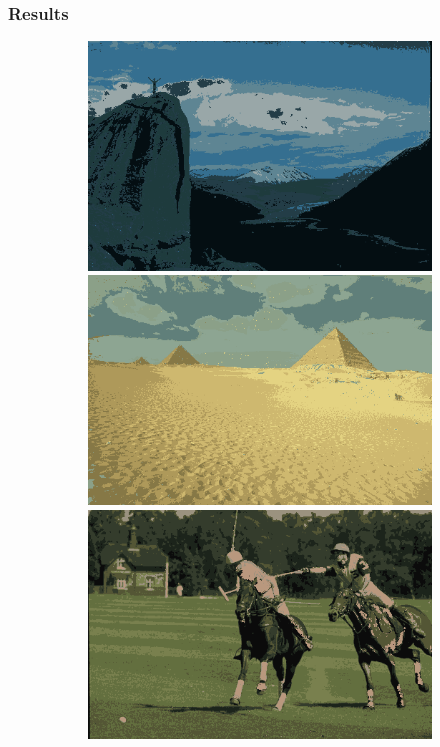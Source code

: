 \documentclass{beamer}
\begin{document}
\begin{frame}
    \frametitle{Results}
    \begin{figure}
        \centering
        \begin{subfigure}[b]{0.23\textwidth}
            \centering
            \includegraphics[width=\textwidth]{../figures/methods/fp/14037_avg.png}
            \includegraphics[width=\textwidth]{../figures/methods/fp/260058_avg.png}
            \includegraphics[width=\textwidth]{../figures/methods/fp/361010_avg.png}

\end{subfigure}
\end{figure}
\end{frame}
\end{document}
